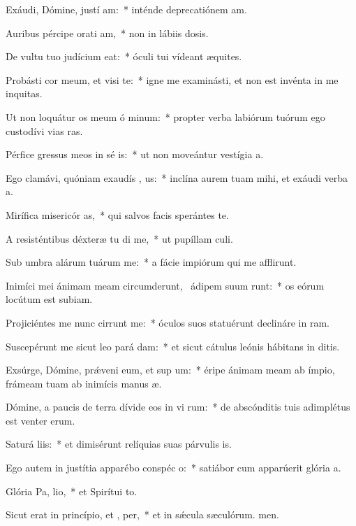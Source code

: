 \item Exáudi, Dómine, justí am:~* inténde deprecatiónem am.
\item Auribus pércipe orati am,~* non in lábiis dosis.
\item De vultu tuo judícium  eat:~* óculi tui vídeant æquites.
\item Probásti cor meum, et visi te:~* igne me examinásti, et non est invénta in me inquitas.
\item Ut non loquátur os meum ó minum:~* propter verba labiórum tuórum ego custodívi vias ras.
\item Pérfice gressus meos in sé is:~* ut non moveántur vestígia a.
\item Ego clamávi, quóniam exaudís , us:~* inclína aurem tuam mihi, et exáudi verba a.
\item Mirífica misericór as,~* qui salvos facis sperántes  te.
\item A resisténtibus déxteræ tu di me,~* ut pupíllam culi.
\item Sub umbra alárum tuárum  me:~* a fácie impiórum qui me afflirunt.
\item Inimíci mei ánimam meam circumderunt,~\pscross{} ádipem suum runt:~* os eórum locútum est subiam.
\item Projiciéntes me nunc cirrunt me:~* óculos suos statuérunt declináre in ram.
\item Suscepérunt me sicut leo pará  dam:~* et sicut cátulus leónis hábitans in ditis.
\item Exsúrge, Dómine, prǽveni eum, et sup um:~* éripe ánimam meam ab ímpio, frámeam tuam ab inimícis manus æ.
\item Dómine, a paucis de terra dívide eos in vi rum:~* de abscónditis tuis adimplétus est venter erum.
\item Saturá  liis:~* et dimisérunt relíquias suas párvulis is.
\item Ego autem in justítia apparébo conspéc o:~* satiábor cum apparúerit glória a.
\item Glória Pa,  lio,~* et Spirítui to.
\item Sicut erat in princípio, et ,  per,~* et in sǽcula sæculórum. men.
